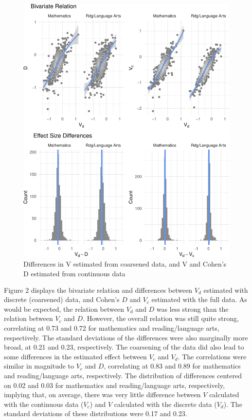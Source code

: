 \documentclass[man, fleqn, noextraspace]{apa6}
\theoremstyle{definition}
\theoremstyle{definition}
\theoremstyle{definition}
\theoremstyle{remark}
\begin{document}
\begin{figure}
\centering
\includegraphics{anderson_ncme18_files/figure-latex/unnamed-chunk-2-1.pdf}
\caption{\label{fig:unnamed-chunk-2}Differences in V estimated from
coarsened data, and V and Cohen's D estimated from continuous data}
\end{figure}

Figure 2 displays the bivariate relation and differences between \(V_d\)
estimated with discrete (coarsened) data, and Cohen's \(D\) and \(V_c\)
estimated with the full data. As would be expected, the relation between
\(V_d\) and \(D\) was less strong than the relation between \(V_c\) and
\(D\). However, the overall relation was still quite strong, correlating
at 0.73 and 0.72 for mathematics and reading/language arts,
respectively. The standard deviations of the differences were also
marginally more broad, at 0.21 and 0.23, respectively. The coarsening of
the data did also lead to some differences in the estimated effect
between \(V_c\) and \(V_d\). The correlations were similar in magnitude
to \(V_c\) and \(D\), correlating at 0.83 and 0.89 for mathematics and
reading/language arts, respectively. The distribution of differences
centered on 0.02 and 0.03 for mathematics and reading/language arts,
respectively, implying that, on average, there was very little
difference between \(V\) calculated with the continuous data (\(V_c\))
and \(V\) calculated with the discrete data (\(V_d\)). The standard
deviations of these distributions were 0.17 and 0.23.
\end{document}
